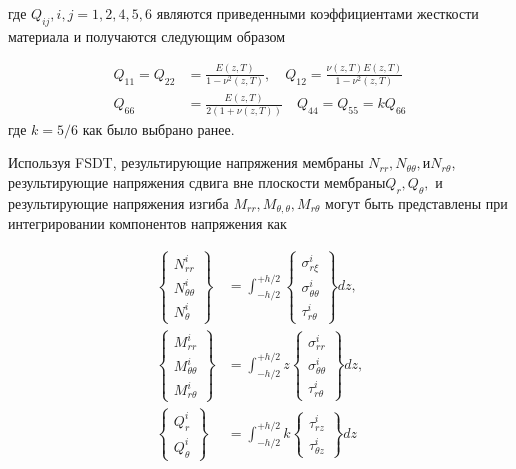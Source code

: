 где \(Q_{ij}, i,j =1, 2, 4, 5, 6\) являются приведенными коэффициентами жесткости материала и получаются следующим образом

\begin{equation}
	\label{eq:vibro2:7}
	\begin{split}
	Q_{11} = Q_{22} &= \frac{E(z, T)}{1-\nu^2(z, T)}, \quad Q_{12}=\frac{\nu(z, T) E(z, T)}{1-\nu^2(z,T)}
	\\
	Q_{66}&=\frac{E(z, T)}{2(1+\nu(z, T))} \quad Q_{44}=Q_{55}=kQ_{66}
	\end{split}
\end{equation}
где \(k=5/6\) как было выбрано ранее.

Используя FSDT, результирующие напряжения мембраны \(N_{rr}, N_{\theta \theta}, и N_{r \theta}\), результирующие напряжения сдвига вне плоскости мембраны\( Q_r , Q_{\theta},\) и результирующие напряжения изгиба \(M_{rr}, M_{\theta, \theta}, M_{r \theta}\) могут быть представлены при интегрировании компонентов напряжения как


\begin{equation}
	\label{eq:vibro2:8}
	\begin{split}
		\begin{Bmatrix}
			N_{r r}^{i} \\
			N_{\theta \theta}^{i} \\
			N_{ \theta}^{i} 
		\end{Bmatrix} &=
		\int_{-h/2}^{+h/2}
		\begin{Bmatrix}
			\sigma_{r \xi}^{i} \\
			\sigma_{\theta \theta}^{i} \\
			\tau_{r \theta}^{i} 
		\end{Bmatrix}
		dz,\\
		\begin{Bmatrix}
			M_{rr}^{i} \\
			M_{\theta \theta}^{i} \\
			M_{r \theta}^{i} 
		\end{Bmatrix} &=
		\int_{-h/2}^{+h/2} z
		\begin{Bmatrix}
			\sigma_{rr}^{i} \\
			\sigma_{\theta \theta}^{i} \\
			\tau_{r \theta}^{i} 
		\end{Bmatrix}
		dz,\\
		\begin{Bmatrix}
			Q_{r}^{i} \\
			Q_{\theta}^{i}
		\end{Bmatrix} &=
		\int_{-h/2}^{+h/2} k
		\begin{Bmatrix}
			\tau_{r z}^{i} \\
			\tau_{\theta z}^{i}
		\end{Bmatrix}
		dz
	\end{split}
\end{equation}


